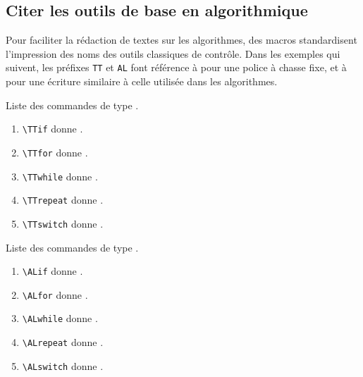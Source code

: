 \documentclass[12pt,a4paper]{article}
\begin{document}


\subsection{Citer les outils de base en algorithmique}

Pour faciliter la rédaction de textes sur les algorithmes, des macros standardisent l'impression des noms des outils classiques de contrôle.
Dans les exemples qui suivent, les préfixes \verb+TT+ et \verb+AL+ font référence à  pour une police à chasse fixe, et à  pour une écriture similaire à celle utilisée dans les algorithmes.



\begin{center}
	Liste des commandes de type .
\end{center}

\begin{enumerate}
    \item \verb+\TTif+ donne \TTif.
    \item \verb+\TTfor+ donne \TTfor.
    \item \verb+\TTwhile+ donne \TTwhile.
    \item \verb+\TTrepeat+ donne \TTrepeat.
    \item \verb+\TTswitch+ donne \TTswitch.
\end{enumerate}

\begin{center}
	Liste des commandes de type .
\end{center}

\begin{enumerate}
    \item \verb+\ALif+ donne \ALif.
    \item \verb+\ALfor+ donne \ALfor.
    \item \verb+\ALwhile+ donne \ALwhile.
    \item \verb+\ALrepeat+ donne \ALrepeat.
    \item \verb+\ALswitch+ donne \ALswitch.
\end{enumerate}

\end{document}

